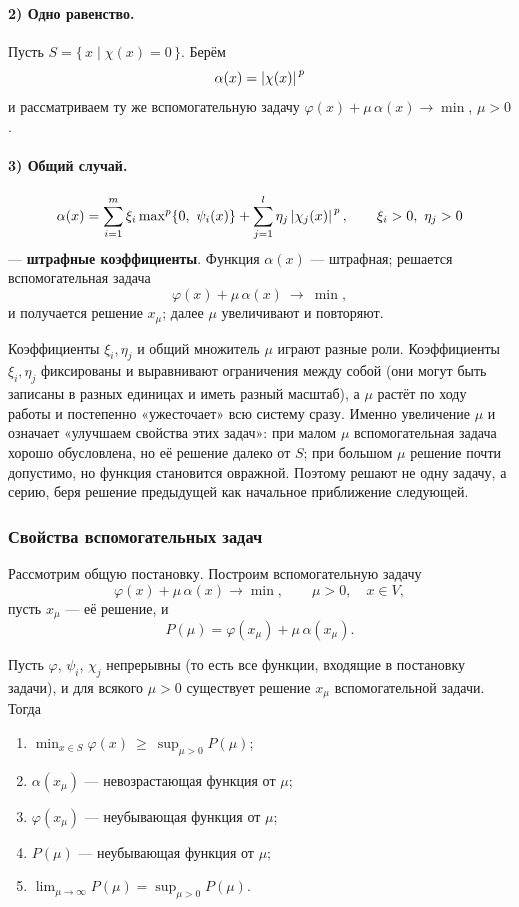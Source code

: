 \paragraph{2) Одно равенство.}
Пусть $S = \{\, x \mid \chi(x) = 0 \,\}$. Берём
\[
  \alpha(x) = \left\lvert \chi(x) \right\rvert^{\,p}
\]
и рассматриваем ту же вспомогательную задачу
$\varphi(x) + \mu\,\alpha(x) \to \min$, $\mu > 0$.

\paragraph{3) Общий случай.}
\[
  \alpha(x) = \sum_{i=1}^{m} \xi_i \max\nolimits^{p}\{0,\ \psi_i(x)\}
            + \sum_{j=1}^{l} \eta_j \left\lvert \chi_j(x) \right\rvert^{\,p} ,
  \qquad \xi_i > 0 ,\ \eta_j > 0
\]
— \textbf{штрафные коэффициенты}. Функция $\alpha(x)$ — штрафная; решается
вспомогательная задача
\[
  \varphi(x) + \mu\,\alpha(x) \ \to\ \min ,
\]
и получается решение $x_\mu$; далее $\mu$ увеличивают и повторяют.

\begin{idea}
Коэффициенты $\xi_i, \eta_j$ и общий множитель $\mu$ играют разные роли.
Коэффициенты $\xi_i, \eta_j$ фиксированы и выравнивают ограничения между собой
(они могут быть записаны в разных единицах и иметь разный масштаб), а $\mu$
растёт по ходу работы и постепенно «ужесточает» всю систему сразу. Именно
увеличение $\mu$ и означает «улучшаем свойства этих задач»: при малом $\mu$
вспомогательная задача хорошо обусловлена, но её решение далеко от $S$; при
большом $\mu$ решение почти допустимо, но функция становится овражной. Поэтому
решают не одну задачу, а серию, беря решение предыдущей как начальное
приближение следующей.
\end{idea}

\subsubsection*{Свойства вспомогательных задач}

Рассмотрим общую постановку. Построим вспомогательную задачу
\[
  \varphi(x) + \mu\,\alpha(x) \to \min , \qquad \mu > 0 , \quad x \in V ,
\]
пусть $x_\mu$ — её решение, и
\[
  P(\mu) = \varphi(x_\mu) + \mu\,\alpha(x_\mu) .
\]

\begin{lemma}\label{lem:penalty}
Пусть $\varphi$, $\psi_i$, $\chi_j$ непрерывны (то есть все функции, входящие в
постановку задачи), и для всякого $\mu > 0$ существует решение $x_\mu$
вспомогательной задачи. Тогда
\begin{enumerate}[label=\arabic*),left=0pt]
  \item $\displaystyle \min_{x \in S} \varphi(x) \ \ge\ \sup_{\mu > 0} P(\mu)$;
  \item $\alpha(x_\mu)$ — невозрастающая функция от $\mu$;
  \item $\varphi(x_\mu)$ — неубывающая функция от $\mu$;
  \item $P(\mu)$ — неубывающая функция от $\mu$;
  \item $\displaystyle \lim_{\mu \to \infty} P(\mu) = \sup_{\mu > 0} P(\mu)$.
\end{enumerate}
\end{lemma}

